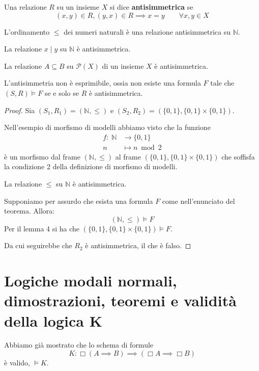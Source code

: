 \documentclass[10pt,a4paper,twoside]{book}
\begin{document}
\begin{definition}
    Una relazione $R$ su un insieme $X$ si dice \textbf{antisimmetrica} se
    \begin{equation*}
        (x,y) \in R, (y,x) \in R \implies x = y \qquad \forall x,y \in X
    \end{equation*}
\end{definition}
\begin{example}
    L'ordinamento $\leq$ dei numeri naturali è una relazione antisimmetrica su $\mathbb{N}$.
\end{example}
\begin{example}
    La relazione $x \mid y$ su $\mathbb{N}$ è antisimmetrica.
\end{example}
\begin{example}
    La relazione $A \subseteq B$ su $\mathcal{P}(X)$ di un insieme $X$ è antisimmetrica.
\end{example}
\begin{theorem}
    L'antisimmetria non è esprimibile, ossia non esiste una formula $F$ tale che $(S,R) \vDash F$ se e solo se $R$ è antisimmetrica.
\end{theorem}
\begin{proof}
    Sia $(S_1,R_1) = (\mathbb{N},\leq)$ e $(S_2, R_2) = (\{0,1\}, \{0,1\} \times \{0,1\})$.

    Nell'esempio di morfismo di modelli abbiamo visto che la funzione
    \begin{align*}
        f: \; \mathbb{N} & \rightarrow \{0,1\} \\
        n                & \mapsto n \bmod 2
    \end{align*}
    è un morfismo dal frame $(\mathbb{N},\leq)$ al frame $(\{0,1\}, \{0,1\} \times \{0,1\})$ che soffisfa la condizione 2 della definizione di morfismo di modelli.

    La relazione $\leq$ su $\mathbb{N}$ è antisimmetrica.

    Supponiamo per assurdo che esista una formula $F$ come nell'enunciato del teorema. Allora:
    \begin{equation*}
        (\mathbb{N},\leq) \vDash F
    \end{equation*}
    Per il lemma 4 si ha che $(\{0,1\}, \{0,1\} \times \{0,1\}) \vDash F$.

    Da cui seguirebbe che $R_2$ è antisimmetrica, il che è falso.
\end{proof}

\newpage
\section{Logiche modali normali, dimostrazioni, teoremi e validità della logica K}
Abbiamo già mostrato che lo schema di formule
\begin{equation*}
    K: \Box (A \implies B) \implies (\Box A \implies \Box B)
\end{equation*}
è valido, $\vDash K$.
\end{document}
